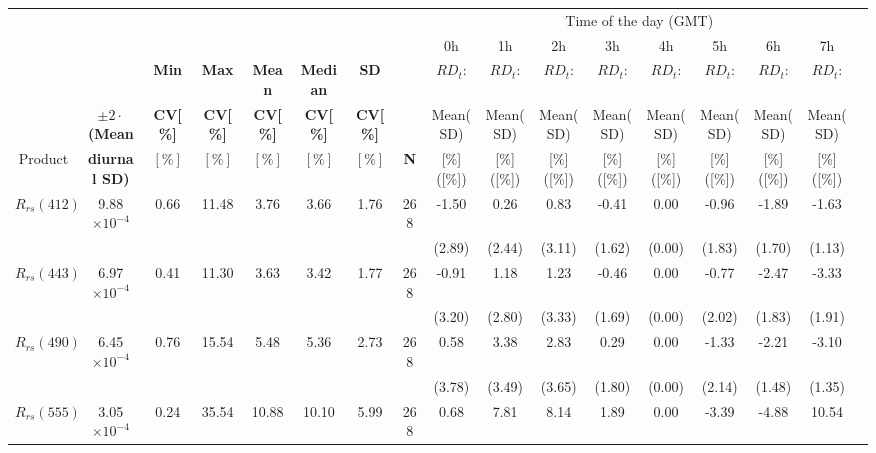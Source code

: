 \documentclass[preview]{standalone}
\begin{document}
\scriptsize
\centering
\setlength\tabcolsep{1.5pt} %
\begin{tabular}{ccccccccccccccccc} \hline
 &&&&&&  &  &   \multicolumn{8}{c}{Time of the day (GMT)} &   \\ \cline{9-16}
 &&&&&& &  &    0h    & 1h  &  2h  &  3h  &  4h  &  5h  &  6h   &  7h &   \\ 
   &  & \bfseries{Min} & \bfseries{Max} & \bfseries{Mean} & \bfseries{Median} & \bfseries{SD} &  &    $RD_t$:    & $RD_t$:  &  $RD_t$:  &  $RD_t$:  &  $RD_t$:  &  $RD_t$:  &  $RD_t$:   &  $RD_t$:  \\ 
   & \bfseries{$\pm2\cdot$(Mean} & \bfseries{CV[\%]} & \bfseries{CV[\%]} & \bfseries{CV[\%]} & \bfseries{CV[\%]} & \bfseries{CV[\%]} &  &    Mean(SD)    & Mean(SD)  &  Mean(SD)  &  Mean(SD)  &  Mean(SD)  &  Mean(SD)  &  Mean(SD)   &  Mean(SD) &  \\ 
Product  & \bfseries{diurnal SD)}  & $[\%]$ & $[\%]$ & $[\%]$ & $[\%]$ & $[\%]$  & \bfseries{N} &    [\%]([\%])    & [\%]([\%])  &  [\%]([\%])  &  [\%]([\%])  &  [\%]([\%])  &  [\%]([\%])  &  [\%]([\%])   &  [\%]([\%])   \\ \hline \hline
$R_{rs}(412)$ 	& 9.88$\times10^{-4}$ 	& 0.66 	&  11.48 	&    3.76 	&	 3.66 	&   1.76 	& 	268 	&   -1.50 	&   0.26	&   0.83 	&  -0.41 	&  0.00 	&  -0.96 	&   -1.89  	&   -1.63  	\\
 				&						&		&			&			&			&			&			&   (2.89) 	&  (2.44) 	&  (3.11) 	&  (1.62) 	& (0.00) 	&  (1.83) 	&   (1.70) 	&   (1.13) 	\\ \hline
$R_{rs}(443)$ 	& 6.97$\times10^{-4}$ 	& 0.41 	&  11.30 	&    3.63 	&	 3.42 	&   1.77 	& 	268 	&   -0.91 	&   1.18 	&   1.23 	&  -0.46  	&  0.00 	&  -0.77  	&   -2.47   &   -3.33 	\\ 
 				&						&		&			&			&			&			&			&   (3.20)	&  (2.80)	&  (3.33)	&  (1.69)	& (0.00)	&  (2.02)	&   (1.83)	&   (1.91)	\\ \hline
$R_{rs}(490)$ 	& 6.45$\times10^{-4}$ 	& 0.76 	&  15.54 	&    5.48 	&	 5.36 	&   2.73 	& 	268 	&    0.58   &   3.38   	&   2.83 	&   0.29  	&  0.00   	&  -1.33   	&   -2.21   &   -3.10  	\\
 				&						&		&			&			&			&			&			&   (3.78) 	&  (3.49) 	&  (3.65) 	&  (1.80) 	& (0.00) 	&  (2.14) 	&   (1.48) 	&   (1.35) 	\\ \hline   
$R_{rs}(555)$ 	& 3.05$\times10^{-4}$ 	& 0.24 	&  35.54 	&  10.88 	&	10.10 	&   5.99 	& 	268 	&    0.68   &   7.81   	&   8.14 	&  1.89  	&  0.00   	&  -3.39   	&  	-4.88   &   10.54  	\\

\end{tabular}
\end{document}
